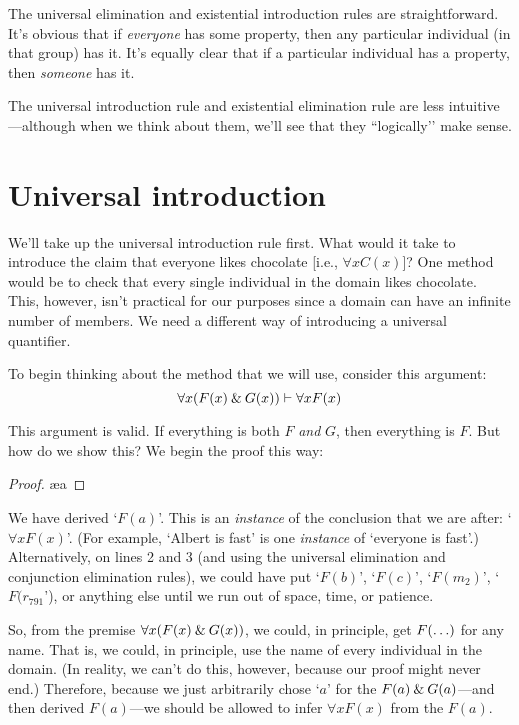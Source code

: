The universal elimination and existential introduction rules are straightforward. It's obvious that if \textit{everyone} has some property, then any particular individual (in that group) has it. It's equally clear that if a particular individual has a property, then \textit{someone} has it.

The universal introduction rule and existential elimination rule are less intuitive---although when we think about them, we'll see that they ``logically’’ make sense. 


\section{Universal introduction}

We'll take up the universal introduction rule first. What would it take to introduce the claim that everyone likes chocolate [i.e., $\forall x C(x)$]? One method would be to check that every single individual in the domain likes chocolate. This, however, isn’t practical for our purposes since a domain can have an infinite number of members.
We need a different way of introducing a universal quantifier.

To begin thinking about the method that we will use, consider this argument:
$$\forall x (F(x) \mathbin{\&} G(x)) \vdash \forall x F(x)$$

\noindent This argument is valid. If everything is both $F$ \emph{and} $G$, then everything is $F$.  But how do we show this?  We begin the proof this way:

\begin{proof}
	 \pr{}
	 
	 \ae{a}
\end{proof}
We have derived `$F(a)$'. This is an \textit{instance} of the conclusion that we are after: `$\forall xF(x)$'. (For example, `Albert is fast' is one \textit{instance} of `everyone is fast'.) 
Alternatively, on lines 2 and 3 (and using the universal elimination and conjunction elimination rules), we could have put `$F(b)$', `$F(c)$', `$F(m_2)$', `$F(r_{791}$'), or anything else until we run out of space, time, or patience.   

So, from the premise $\forall x (F(x) \mathbin{\&} G(x))$, we could, in principle, get $F(\mathsf{\ldots})$ for any name. That is, we could, {in principle}, use the name of every individual in the domain. (In reality, we can't do this, however, because our proof might never end.)
Therefore, because we just arbitrarily chose `$a$' for the $F(a) \mathbin{\&} G(a)$---and then derived $F(a)$---we should be allowed to infer $\forall x F(x)$ from the $F(a)$.  

